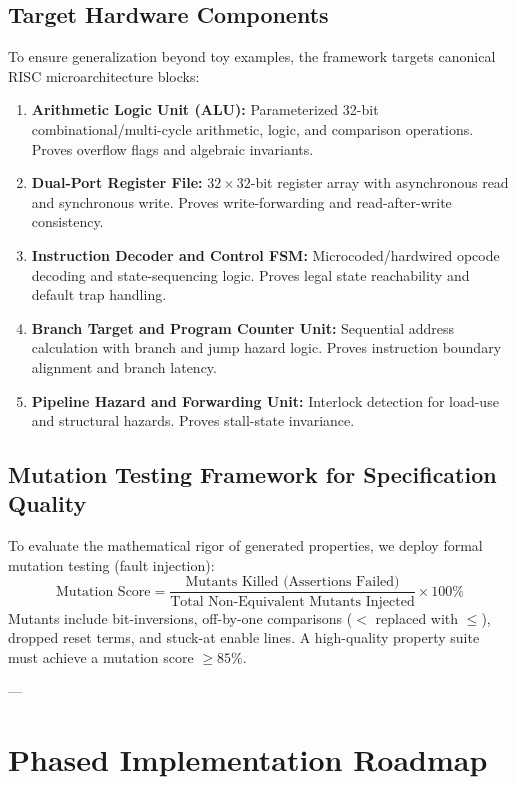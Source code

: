 \documentclass[11pt,a4paper]{article}
\begin{document}
\subsection{Target Hardware Components}
To ensure generalization beyond toy examples, the framework targets canonical RISC microarchitecture blocks:
\begin{enumerate}
    \item \textbf{Arithmetic Logic Unit (ALU):} Parameterized 32-bit combinational/multi-cycle arithmetic, logic, and comparison operations. Proves overflow flags and algebraic invariants.
    \item \textbf{Dual-Port Register File:} $32 \times 32$-bit register array with asynchronous read and synchronous write. Proves write-forwarding and read-after-write consistency.
    \item \textbf{Instruction Decoder and Control FSM:} Microcoded/hardwired opcode decoding and state-sequencing logic. Proves legal state reachability and default trap handling.
    \item \textbf{Branch Target and Program Counter Unit:} Sequential address calculation with branch and jump hazard logic. Proves instruction boundary alignment and branch latency.
    \item \textbf{Pipeline Hazard and Forwarding Unit:} Interlock detection for load-use and structural hazards. Proves stall-state invariance.
\end{enumerate}

\subsection{Mutation Testing Framework for Specification Quality}
To evaluate the mathematical rigor of generated properties, we deploy formal mutation testing (fault injection):
\begin{equation}
    \text{Mutation Score} = \frac{\text{Mutants Killed (Assertions Failed)}}{\text{Total Non-Equivalent Mutants Injected}} \times 100\%
\end{equation}
Mutants include bit-inversions, off-by-one comparisons ($<$ replaced with $\le$), dropped reset terms, and stuck-at enable lines. A high-quality property suite must achieve a mutation score $\ge 85\%$.

---

\section{Phased Implementation Roadmap}
\end{document}
